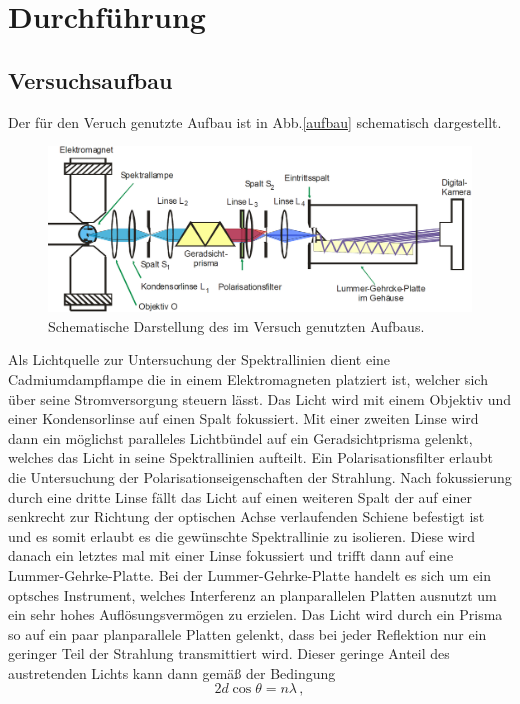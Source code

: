 \section{Durchführung}
\subsection{Versuchsaufbau}
Der für den Veruch genutzte Aufbau ist in Abb.\ref{aufbau} schematisch dargestellt.
\begin{figure}
  \centering
  \includegraphics[width=\textwidth]{Bilder/aufbau.png}
  \caption{Schematische Darstellung des im Versuch genutzten Aufbaus.\cite{anleitung}}
\end{figure}
Als Lichtquelle zur Untersuchung der Spektrallinien dient eine Cadmiumdampflampe die in einem Elektromagneten platziert ist, welcher sich über seine Stromversorgung steuern lässt. Das Licht wird mit einem Objektiv und einer Kondensorlinse auf einen Spalt fokussiert. Mit einer zweiten Linse wird dann ein möglichst paralleles Lichtbündel auf ein Geradsichtprisma gelenkt, welches das Licht in seine Spektrallinien aufteilt. Ein Polarisationsfilter erlaubt die Untersuchung der Polarisationseigenschaften der Strahlung. Nach fokussierung durch eine dritte Linse fällt das Licht auf einen weiteren Spalt der auf einer senkrecht zur Richtung der optischen Achse verlaufenden Schiene befestigt ist und es somit erlaubt es die gewünschte Spektrallinie zu isolieren. Diese wird danach ein letztes mal mit einer Linse fokussiert und trifft dann auf eine Lummer-Gehrke-Platte.
Bei der Lummer-Gehrke-Platte handelt es sich um ein optsches Instrument, welches Interferenz an planparallelen Platten ausnutzt um ein sehr hohes Auflösungsvermögen zu erzielen. Das Licht wird durch ein Prisma so auf ein paar planparallele Platten gelenkt, dass bei jeder Reflektion nur ein geringer Teil der Strahlung transmittiert wird. Dieser geringe Anteil des austretenden Lichts kann dann gemäß der Bedingung
\begin{equation}
2d\cos{\theta}=n\lambda\,,
\end{equation}
